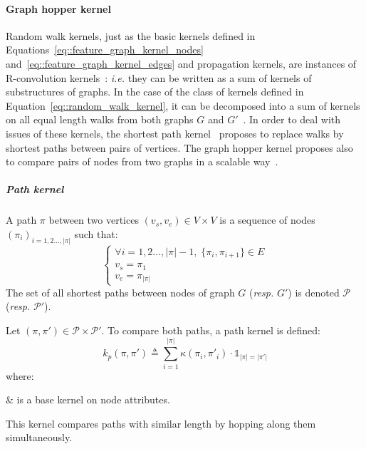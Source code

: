             \paragraph{Graph hopper kernel}
                Random walk kernels, just as the basic kernels defined in Equations~\ref{eq::feature_graph_kernel_nodes} and~\ref{eq::feature_graph_kernel_edges} and propagation kernels, are instances of R-convolution kernels~\parencite{haussler1999convolution}: \textit{i.e.} they can be written as a sum of kernels of substructures of graphs.
                In the case of the class of kernels defined in Equation~\ref{eq::random_walk_kernel}, it can be decomposed into a sum of kernels on all equal length walks from both graphs \(G\) and \(G'\)~\parencite{vishwanathan2010graph}.
                In order to deal with issues of these kernels, the shortest path kernel~\parencite{borgwardt2005shortest} proposes to replace walks by shortest paths between pairs of vertices.
                The graph hopper kernel proposes also to compare pairs of nodes from two graphs in a scalable way~\parencite{feragen2013scalable}.

                \subparagraph{Path kernel}
                    A path \(\pi\) between two vertices \((v_s,v_e) \in V\times V\) is a sequence of nodes \(\left(\pi_i\right)_{i=1,2\dots,\vert \pi \vert}\) such that:
                    \begin{equation*}
                        \begin{cases}
                            \forall i=1,2\dots,\vert \pi \vert-1,\; \{\pi_i, \pi_{i+1}\} \in E\\
                            v_s = \pi_1\\
                            v_e = \pi_{\vert \pi \vert}
                        \end{cases}
                    \end{equation*}
                    The set of all shortest paths between nodes of graph \(G\) (\textit{resp.} \(G'\)) is denoted \(\mathscr{P}\) (\textit{resp.} \(\mathscr{P}'\)).

                    Let \(\left(\pi, \pi'\right) \in \mathscr{P} \times \mathscr{P}'\).
                    To compare both paths, a path kernel is defined:
                    \begin{equation}
                        \label{eq::path_kernel}
                        k_p(\pi, \pi') \triangleq \sum_{i=1}^{\vert \pi \vert} \kappa\left(\pi_i, \pi'_i\right) \cdot \mathbb{1}_{\vert \pi \vert = \vert \pi' \vert}
                    \end{equation}
                    where:
                    \begin{conditions}
                        \kappa & is a base kernel on node attributes.
                    \end{conditions}
                    This kernel compares paths with similar length by hopping along them simultaneously.

